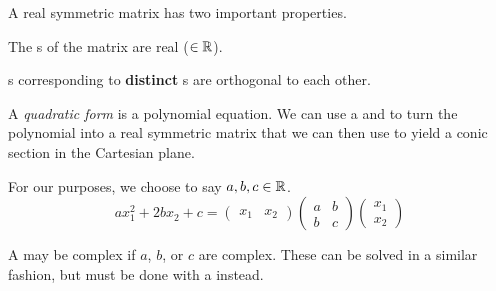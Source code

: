A real symmetric matrix has two important properties.
\begin{propertylist}
\item The s of the matrix are real ($\in \operatorname{\mathbb{R}}$).\label{prop:Real_Symmetric_Matrix-Real_Eigenvalues}
\item {}s corresponding to \textbf{distinct} s are orthogonal to each other.\label{prop:Real_Symmetric_Matrix-Distinct_Eigenvectors}
\end{propertylist}

\begin{definition}\label{def:Quadratic_Form}
  A \emph{quadratic form} is a polynomial equation.
  We can use a  and  to turn the polynomial into a real symmetric matrix that we can then use to yield a conic section in the Cartesian plane.

  For our purposes, we choose to say $a, b, c \in \operatorname{\mathbb{R}}$.
  \begin{equation}\label{eq:Quadratic_Form}
    ax_{1}^{2} + 2bx_{2} + c =
    \begin{pmatrix}
      x_{1} & x_{2}
    \end{pmatrix}
    \begin{pmatrix}
      a & b \\
      b & c
    \end{pmatrix}
    \begin{pmatrix}
      x_{1} \\ x_{2}
    \end{pmatrix}
  \end{equation}

  \begin{remark}\label{rmk:Complex_Quadratic_Form}
    A  may be complex if $a$, $b$, or $c$ are complex.
    These can be solved in a similar fashion, but must be done with a  instead.
  \end{remark}
\end{definition}


